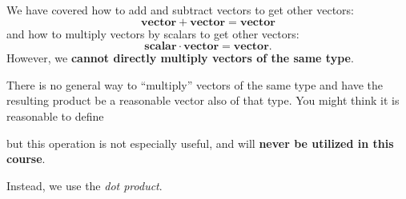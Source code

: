 \documentclass{ximera}
\begin{document}
We have covered how to add and subtract vectors to get other vectors:
\[
\mathbf{vector} +\mathbf{vector} = \mathbf{vector}
\]
and how to multiply vectors by scalars to get other vectors:
\[
\mathbf{scalar}\cdot \mathbf{vector} = \mathbf{vector}.
\]
However, we \textbf{cannot directly multiply vectors of the same type}. 
 \begin{warning}
  There is no general way to ``multiply'' vectors of the same type and
  have the resulting product be a reasonable vector also of that type.
  You might think it is reasonable to define
  \begin{center}
  \end{center}
but this operation is not especially useful, and will \textbf{never be
  utilized in this course}.
\end{warning}

 Instead, we use the \textit{dot product}.
\end{document}
